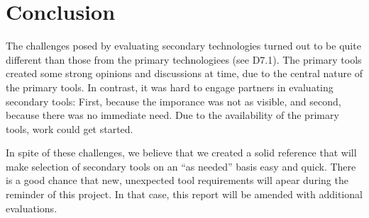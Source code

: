 

\chapter{Conclusion}
\label{sec:concl}

The challenges posed by evaluating secondary technologies turned out to be quite different than those from the primary technologiees (see D7.1).  The primary tools created some strong opinions and discussions at time, due to the central nature of the primary tools.  In contrast, it was hard to engage partners in evaluating secondary tools:  First, because the imporance was not as visible, and second, because there was no immediate need.  Due to the availability of the primary tools, work could get started.

In spite of these challenges, we believe that we created a solid reference that will make selection of secondary tools on an ``as needed'' basis easy and quick.  There is a good chance that new, unexpected tool requirements will apear during the reminder of this project.  In that case, this report will be amended with additional evaluations.
